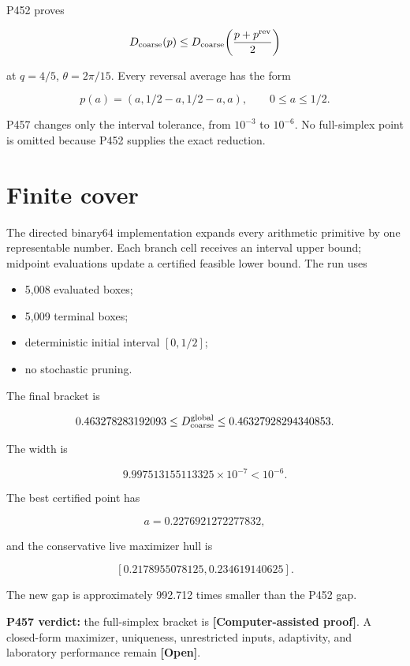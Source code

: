 \documentclass[11pt,a4paper,openany]{report}
\begin{document}
P452 proves

\[
D_{\rm coarse}(p)
\le D_{\rm coarse}\!\left(\frac{p+p^{\rm rev}}2\right)
\]

at \(q=4/5\), \(\theta=2\pi/15\). Every reversal average has the form

\[
p(a)=(a,1/2-a,1/2-a,a),
\qquad0\le a\le1/2.
\]

P457 changes only the interval tolerance, from \(10^{-3}\) to \(10^{-6}\). No full-simplex point is omitted because P452 supplies the exact reduction.

\section{Finite cover}

The directed binary64 implementation expands every arithmetic primitive by one representable number. Each branch cell receives an interval upper bound; midpoint evaluations update a certified feasible lower bound. The run uses

\begin{itemize}
\item 
5,008 evaluated boxes;

\item 
5,009 terminal boxes;

\item 
deterministic initial interval \([0,1/2]\);

\item 
no stochastic pruning.

\end{itemize}

The final bracket is

\[
0.463278283192093
\le D_{\rm coarse}^{\rm global}
\le0.46327928294340853.
\]

The width is

\[
9.997513155113325\times10^{-7}<10^{-6}.
\]

The best certified point has

\[
a=0.2276921272277832,
\]

and the conservative live maximizer hull is

\[
[0.2178955078125,0.234619140625].
\]

The new gap is approximately 992.712 times smaller than the P452 gap.

\textbf{P457 verdict:} the full-simplex bracket is \textbf{\textcolor{fingreen}{[Computer-assisted proof]}}. A closed-form maximizer, uniqueness, unrestricted inputs, adaptivity, and laboratory performance remain \textbf{\textcolor{finorange}{[Open]}}.
\end{document}
